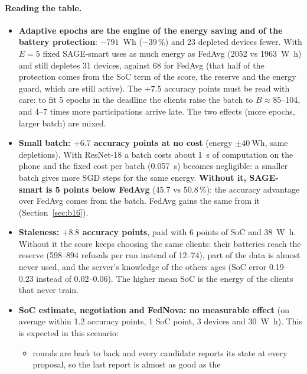 \documentclass[11pt,a4paper]{article}
\begin{document}
\paragraph{Reading the table.}
\begin{itemize}
  \item \textbf{Adaptive epochs are the engine of the energy saving and of
        the battery protection}: $-791$~Wh ($-39\,\%$) and 23 depleted devices
        fewer. With $E=5$ fixed SAGE-smart uses as much energy as FedAvg
        (2052 vs \SI{1963}{\watt\hour}) and still depletes 31 devices, against 68
        for FedAvg (that half of the protection comes from the SoC term of the
        score, the reserve and the energy guard, which are still active). The
        $+7.5$ accuracy points must be read with care: to fit 5 epochs in the
        deadline the clients raise the batch to $B\approx 85$--104, and 4--7
        times more participations arrive late. The two effects (more epochs,
        larger batch) are mixed.
  \item \textbf{Small batch: $+6.7$ accuracy points at no cost} (energy
        $\pm\SI{40}{\watt\hour}$, same depletions). With ResNet-18 a batch costs
        about \SI{1}{\second} of computation on the phone and the fixed cost per
        batch (\SI{0.057}{\second}) becomes negligible: a smaller batch gives
        more SGD steps for the same energy. \textbf{Without it, SAGE-smart is
        5 points below FedAvg} (45.7 vs 50.8\,\%): the accuracy advantage over
        FedAvg comes from the batch. FedAvg gains the same from it
        (Section~\ref{sec:b16}).
  \item \textbf{Staleness: $+8.8$ accuracy points}, paid with 6 points of SoC
        and \SI{38}{\watt\hour}. Without it the score keeps choosing the same
        clients: their batteries reach the reserve (598--894 refusals per run
        instead of 12--74), part of the data is almost never used, and the
        server's knowledge of the others ages (SoC error 0.19--0.23 instead of
        0.02--0.06). The higher mean SoC is the energy of the clients that
        never train.
  \item \textbf{SoC estimate, negotiation and FedNova: no measurable effect}
        (on average within 1.2 accuracy points, 1 SoC point, 3 devices and
        \SI{30}{\watt\hour}). This is expected in this scenario:
        \begin{itemize}
          \item rounds are back to back and every candidate reports its state at
                every proposal, so the last report is almost as good as the

\end{itemize}
\end{itemize}
\end{document}
